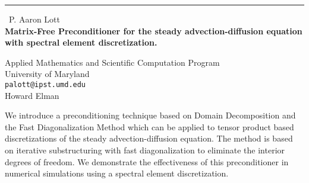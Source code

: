 \documentclass{report}
\begin{document}
\begin{center}
\rule{6in}{1pt} \
{\large P. Aaron Lott \\
{\bf Matrix-Free Preconditioner for the steady advection-diffusion
equation with spectral element discretization.
}}

Applied Mathematics and Scientific Computation Program \\ 
University of Maryland \\
{\tt palott@ipst.umd.edu}\\
Howard Elman
\end{center}

We introduce a preconditioning technique based on Domain Decomposition and the Fast Diagonalization Method which can be applied to tensor product based discretizations of the steady advection-diffusion equation. The method is based on iterative substructuring with fast diagonalization to eliminate the interior degrees of freedom. We demonstrate the effectiveness of this preconditioner in numerical simulations using a spectral element discretization.
\end{document}
